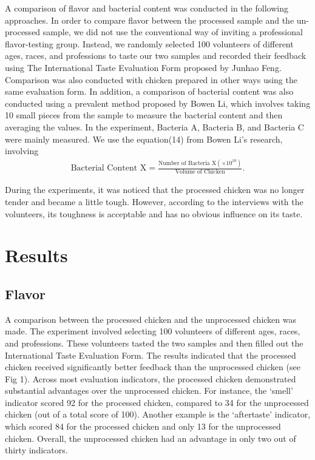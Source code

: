 \documentclass[a4paper,12pt]{article}
\begin{document}
	A comparison of flavor and bacterial content was conducted in the following approaches. In order to compare flavor between the processed sample and the un-processed sample, we did not use the conventional way of inviting a professional flavor-testing group\cite{zxh}. Instead, we randomly selected 100 volunteers of different ages, races, and professions to taste our two samples and recorded their feedback using The International Taste Evaluation Form proposed by Junhao Feng\cite{fjh}. Comparison was also conducted with chicken prepared in other ways using the same evaluation form. In addition, a comparison of bacterial content was also conducted using a prevalent method proposed by Bowen Li\cite{lbw}, which involves taking 10 small pieces from the sample to measure the bacterial content and then averaging the values. In the experiment, Bacteria A, Bacteria B, and Bacteria C were mainly measured. We use the equation(14) from Bowen Li's research\cite{lbw}, involving
	\begin{align}
		\text{Bacterial Content X}=\frac{\text{Number of Bacteria X}(\times 10^{10})}{\text{Volume of Chicken}}.
	\end{align}

    During the experiments, it was noticed that the processed chicken was no longer tender and became a little tough. However, according to the interviews with the volunteers, its toughness is acceptable and has no obvious influence on its taste.
	\section{Results}
    \subsection*{Flavor}
    A comparison between the processed chicken and the unprocessed chicken was made. The experiment involved selecting 100 volunteers of different ages, races, and professions. These volunteers tasted the two samples and then filled out the International Taste Evaluation Form\cite{fjh}. The results indicated that the processed chicken received significantly better feedback than the unprocessed chicken (see Fig 1). Across most evaluation indicators, the processed chicken demonstrated substantial advantages over the unprocessed chicken. For instance, the ‘smell’ indicator scored 92 for the processed chicken, compared to 34 for the unprocessed chicken (out of a total score of 100). Another example is the ‘aftertaste’ indicator, which scored 84 for the processed chicken and only 13 for the unprocessed chicken. Overall, the unprocessed chicken had an advantage in only two out of thirty indicators.
\end{document}
